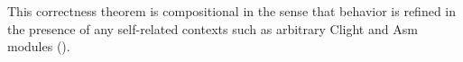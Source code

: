 %
\noindent This correctness theorem is compositional in the sense that behavior is refined in the
presence of any self-related contexts such as arbitrary \textrm{Clight} and \textrm{Asm} modules
().





